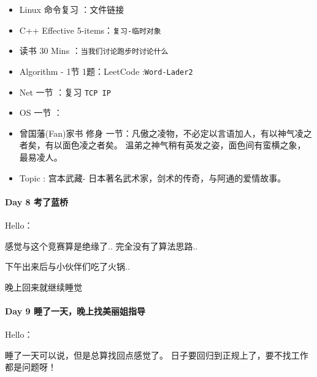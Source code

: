 \documentclass[UTF8,a4paper,8pt]{ctexart}
\begin{document}
		 	 \begin{itemize}[itemindent = 1em]
		 	 	\renewcommand\labelitemi{\makebox[0pt][l]{$\square$}\hspace{1em}} 
		 	 	\renewcommand\labelitemi{\makebox[0pt][l]{$\square$}\raisebox{.15ex}{\hspace{0.1em}$\checkmark$}}	 	
		 	 	\item   Linux 命令复习 ：文件链接
		 	 	\item   C++ Effective 5-items：\verb|复习-临时对象|
		 	 	
		 	 	\item   读书  30 Mins	：\verb|当我们讨论跑步时讨论什么|
		 	 	\item   Algorithm - 1节 1题：LeetCode :\verb|Word-Lader2|	
		 	 	\item   Net 一节 ：复习 \verb|TCP IP|	
		 	 	\renewcommand\labelitemi{\makebox[0pt][l]{$\square$}\hspace{1em}} 
		 	 	
		 	 	\item   OS  一节 ：
		 	 	
		 	 	\renewcommand\labelitemi{\makebox[0pt][l]{$\square$}\raisebox{.15ex}{\hspace{0.1em}$\checkmark$}}
		 	 	\item   曾国藩(Fan)家书 修身 一节：凡傲之凌物，不必定以言语加人，有以神气凌之者矣，有以面色凌之者矣。 温弟之神气稍有英发之姿，面色间有蛮横之象，最易凌人。
		 	 	\item   Topic : 宫本武藏- 日本著名武术家，剑术的传奇，与阿通的爱情故事。
		 	 \end{itemize}
 	 \paragraph{Day 8  考了蓝桥     \quad     }
	 	 Hello：
	 	 
	 	 感觉与这个竞赛算是绝缘了.. 完全没有了算法思路..
	 	 
	 	 下午出来后与小伙伴们吃了火锅..
	 	 
	 	 晚上回来就继续睡觉
 	 \paragraph{Day 9  睡了一天，晚上找美丽姐指导     \quad     }
	 	 Hello：
	 	 
	 	 睡了一天可以说，但是总算找回点感觉了。 日子要回归到正规上了，要不找工作都是问题呀！
	 	 
\end{document}

